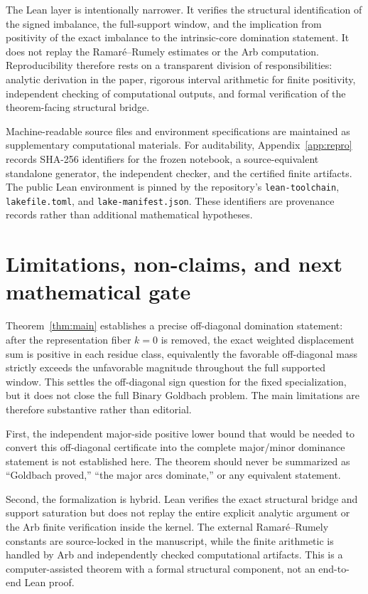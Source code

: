 \documentclass[11pt]{article}
\theoremstyle{definition}
\begin{document}
The Lean layer is intentionally narrower. It verifies the structural identification of the signed imbalance, the full-support window, and the implication from positivity of the exact imbalance to the intrinsic-core domination statement. It does not replay the Ramar\'{e}--Rumely estimates or the Arb computation. Reproducibility therefore rests on a transparent division of responsibilities: analytic derivation in the paper, rigorous interval arithmetic for finite positivity, independent checking of computational outputs, and formal verification of the theorem-facing structural bridge.

Machine-readable source files and environment specifications are maintained as supplementary computational materials. For auditability, Appendix~\ref{app:repro} records SHA-256 identifiers for the frozen notebook, a source-equivalent standalone generator, the independent checker, and the certified finite artifacts. The public Lean environment is pinned by the repository's \texttt{lean-toolchain}, \texttt{lakefile.toml}, and \texttt{lake-manifest.json}. These identifiers are provenance records rather than additional mathematical hypotheses.

\section{Limitations, non-claims, and next mathematical gate}\label{sec:limits}

Theorem~\ref{thm:main} establishes a precise off-diagonal domination statement: after the representation fiber $k=0$ is removed, the exact weighted displacement sum is positive in each residue class, equivalently the favorable off-diagonal mass strictly exceeds the unfavorable magnitude throughout the full supported window. This settles the off-diagonal sign question for the fixed specialization, but it does not close the full Binary Goldbach problem. The main limitations are therefore substantive rather than editorial.

First, the independent major-side positive lower bound that would be needed to convert this off-diagonal certificate into the complete major/minor dominance statement is not established here. The theorem should never be summarized as ``Goldbach proved,'' ``the major arcs dominate,'' or any equivalent statement.

Second, the formalization is hybrid. Lean verifies the exact structural bridge and support saturation but does not replay the entire explicit analytic argument or the Arb finite verification inside the kernel. The external Ramar\'{e}--Rumely constants are source-locked in the manuscript, while the finite arithmetic is handled by Arb and independently checked computational artifacts. This is a computer-assisted theorem with a formal structural component, not an end-to-end Lean proof.
\end{document}
